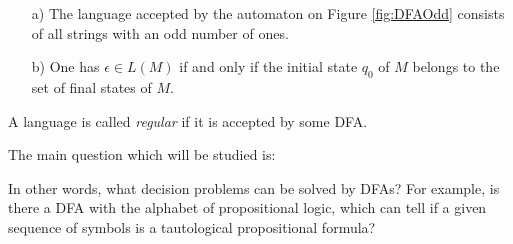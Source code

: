 \begin{page}
\setcounter{section}{1}
\setcounter{subsection}{2}
\setcounter{dfn}{3}
\label{portion:903}

\begin{exl}
\par\noindent
\begin{enumerate}
\item[a)]
The language accepted by the automaton on Figure \ref{fig:DFAOdd} consists of all strings with an odd number of ones.
\item[b)]
One has $\epsilon \in L(M)$ if and only if the initial state $q_0$ of $M$ belongs to the set of final states of $M$.
\end{enumerate}
\end{exl}

\end{page}

\begin{page}
\setcounter{section}{1}
\setcounter{subsection}{2}
\setcounter{dfn}{4}
\label{portion:906}

\begin{dfn}
A language is called \emph{regular} if it is accepted by some DFA.
\end{dfn}

\end{page}

\begin{page}
\setcounter{section}{1}
\setcounter{subsection}{2}
\setcounter{dfn}{4}
\label{portion:907}


The main question which will be studied is:
\begin{center}
\end{center}

In other words, what decision problems can be solved by DFAs?
For example, is there a DFA with the alphabet of propositional logic, which can tell if a given sequence of symbols is a tautological propositional formula?


\end{page}

